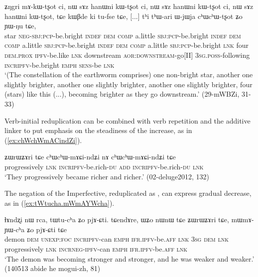 \begin{exe}
\ex \label{ex:chWchWtsxot}
\gll ʑŋgri mɤ-kɯ-tʂot ci, nɯ sɤz hanɯni kɯ-tʂot ci, nɯ sɤz hanɯni kɯ-tʂot ci, nɯ sɤz hanɯni kɯ-tʂot,
tɕe kɯβde ki tu-fse tɕe, [...] tʰi tʰɯ-ari ɯ-jɯja cʰɯ\redp{}cʰɯ-tʂot ʑo ɲɯ-ŋu tɕe, \\
star \textsc{neg}-\textsc{sbj}:\textsc{pcp}-be.bright \textsc{indef} \textsc{dem} \textsc{comp} a.little \textsc{sbj}:\textsc{pcp}-be.bright \textsc{indef} \textsc{dem} \textsc{comp} a.little \textsc{sbj}:\textsc{pcp}-be.bright \textsc{indef} \textsc{dem} \textsc{comp} a.little \textsc{sbj}:\textsc{pcp}-be.bright  \textsc{lnk} four \textsc{dem}.\textsc{prox} \textsc{ipfv}-be.like \textsc{lnk} { } downstream \textsc{aor}:\textsc{downstream}-go[II] \textsc{3sg}.\textsc{poss}-following \textsc{incr}\redp{}\textsc{ipfv}-be.bright \textsc{emph} \textsc{sens}-be \textsc{lnk} \\
\glt `(The constellation of the earthworm comprises) one non-bright star, another one slightly brighter, another one slightly brighter, another one slightly brighter, four (stars) like this (...), becoming brighter as they go downstream.' (29-mWBZi, 31-33)
\end{exe}

Verb-initial reduplication can be combined with verb repetition and the additive linker   to put emphasis on the steadiness of the increase, as in (\ref{ex:chWchWmACindZi}).

\begin{exe}
\ex \label{ex:chWchWmACindZi}
\gll   ʑɯrɯʑɤri tɕe cʰɯ\redp{}cʰɯ-mɤɕi-ndʑi nɤ cʰɯ\redp{}cʰɯ-mɤɕi-ndʑi tɕe \\
progressively \textsc{lnk} \textsc{incr}\redp{}\textsc{ipfv}-be.rich-\textsc{du} \textsc{add} \textsc{incr}\redp{}\textsc{ipfv}-be.rich-\textsc{du} \textsc{lnk} \\
\glt `They progressively became richer and richer.' (02-deluge2012, 132)
\end{exe}

The negation  of the Imperfective, reduplicated as , can express gradual decrease, as in (\ref{ex:tWtucha.mWmAYWcha}).

\begin{exe}
\ex \label{ex:tWtucha.mWmAYWcha}
\gll ɬɤndʐi nɯ rca, tɯ\redp{}tu-cʰa ʑo pjɤ-ɕti. tɕendɤre, ɯʑo nɯnɯ tɕe ʑɯrɯʑɤri tɕe, mɯ\redp{}mɤ-ɲɯ-cʰa ʑo pjɤ-ɕti tɕe \\
demon \textsc{dem} \textsc{unexp}:\textsc{foc} \textsc{incr}\redp{}\textsc{ipfv}-can \textsc{emph} \textsc{ifr}.\textsc{ipfv}-be.\textsc{aff} \textsc{lnk} \textsc{3sg} \textsc{dem} \textsc{lnk} progressively \textsc{lnk} \textsc{incr}\redp{}\textsc{neg}-\textsc{ipfv}-can \textsc{emph} \textsc{ifr}.\textsc{ipfv}-be.\textsc{aff} \textsc{lnk} \\
\glt `The demon was becoming stronger and stronger, and he was weaker and weaker.' (140513 abide he mogui-zh, 81)
\end{exe}

